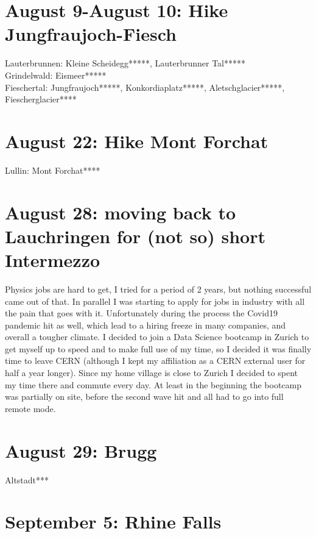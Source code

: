 \section{August 9-August 10: Hike Jungfraujoch-Fiesch}
\label{2020:Aletsch}

Lauterbrunnen: Kleine Scheidegg*****, Lauterbrunner Tal*****\\
Grindelwald: Eismeer*****\\
Fieschertal: Jungfraujoch*****, Konkordiaplatz*****, Aletschglacier*****, Fiescherglacier****\\

\section{August 22: Hike Mont Forchat}
\label{2020:Forchat}

Lullin: Mont Forchat****

\section{August 28: moving back to Lauchringen for (not so) short Intermezzo}
\label{moveGeneva}

Physics jobs are hard to get, I tried for a period of 2 years, but nothing successful came out of that. In parallel I was starting to apply for jobs in industry with all the pain that goes with it. Unfortunately during the process the Covid19 pandemic hit as well, which lead to a hiring freeze in many companies, and overall a tougher climate. I decided to join a Data Science bootcamp in Zurich to get myself up to speed and to make full use of my time, so I decided it was finally time to leave CERN (although I kept my affiliation as a CERN external user for half a year longer). Since my home village is close to Zurich I decided to spent my time there and commute every day. At least in the beginning the bootcamp was partially on site, before the second wave hit and all had to go into full remote mode.

\section{August 29: Brugg}
\label{2020:Brugg}

Altstadt***

\section{September 5: Rhine Falls}
\label{2020:Rheinfall}

